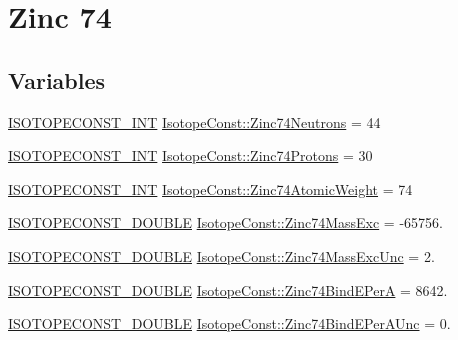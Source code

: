 \hypertarget{group___isotope_const-_zinc-_zn74}{}\section{Zinc 74}
\label{group___isotope_const-_zinc-_zn74}
\subsection*{Variables}
\begin{DoxyCompactItemize}
\item 
\mbox{\hyperlink{group___isotope_const-_macros_ga5f18360b3e99483a35c32d789e62621c}{I\+S\+O\+T\+O\+P\+E\+C\+O\+N\+S\+T\+\_\+\+I\+NT}} \mbox{\hyperlink{group___isotope_const-_zinc-_zn74_ga9690665eadc9a0b6b210cf5584726fda}{Isotope\+Const\+::\+Zinc74\+Neutrons}} = 44
\item 
\mbox{\hyperlink{group___isotope_const-_macros_ga5f18360b3e99483a35c32d789e62621c}{I\+S\+O\+T\+O\+P\+E\+C\+O\+N\+S\+T\+\_\+\+I\+NT}} \mbox{\hyperlink{group___isotope_const-_zinc-_zn74_ga0c185e2e3de921c9a9a48c27547aaaf5}{Isotope\+Const\+::\+Zinc74\+Protons}} = 30
\item 
\mbox{\hyperlink{group___isotope_const-_macros_ga5f18360b3e99483a35c32d789e62621c}{I\+S\+O\+T\+O\+P\+E\+C\+O\+N\+S\+T\+\_\+\+I\+NT}} \mbox{\hyperlink{group___isotope_const-_zinc-_zn74_gad34064e3c5da78dcb7d4268b9ccbb008}{Isotope\+Const\+::\+Zinc74\+Atomic\+Weight}} = 74
\item 
\mbox{\hyperlink{group___isotope_const-_macros_ga8f45a7272ce02c0b4c65c44636ed719a}{I\+S\+O\+T\+O\+P\+E\+C\+O\+N\+S\+T\+\_\+\+D\+O\+U\+B\+LE}} \mbox{\hyperlink{group___isotope_const-_zinc-_zn74_ga049bdb1eddde636e6e1a785930d51a52}{Isotope\+Const\+::\+Zinc74\+Mass\+Exc}} = -\/65756.
\item 
\mbox{\hyperlink{group___isotope_const-_macros_ga8f45a7272ce02c0b4c65c44636ed719a}{I\+S\+O\+T\+O\+P\+E\+C\+O\+N\+S\+T\+\_\+\+D\+O\+U\+B\+LE}} \mbox{\hyperlink{group___isotope_const-_zinc-_zn74_ga7d47c4dd5d86783e9f71c1973cc8db81}{Isotope\+Const\+::\+Zinc74\+Mass\+Exc\+Unc}} = 2.
\item 
\mbox{\hyperlink{group___isotope_const-_macros_ga8f45a7272ce02c0b4c65c44636ed719a}{I\+S\+O\+T\+O\+P\+E\+C\+O\+N\+S\+T\+\_\+\+D\+O\+U\+B\+LE}} \mbox{\hyperlink{group___isotope_const-_zinc-_zn74_ga9f02656f8efbcd102b7bd9b7bc5dd31a}{Isotope\+Const\+::\+Zinc74\+Bind\+E\+PerA}} = 8642.
\item 
\mbox{\hyperlink{group___isotope_const-_macros_ga8f45a7272ce02c0b4c65c44636ed719a}{I\+S\+O\+T\+O\+P\+E\+C\+O\+N\+S\+T\+\_\+\+D\+O\+U\+B\+LE}} \mbox{\hyperlink{group___isotope_const-_zinc-_zn74_ga7074c37edcb4ee0ad70620c66cce2660}{Isotope\+Const\+::\+Zinc74\+Bind\+E\+Per\+A\+Unc}} = 0.

\end{DoxyCompactItemize}
